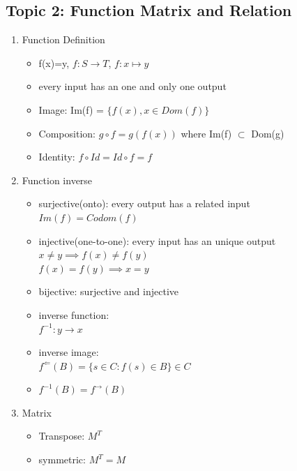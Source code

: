 \documentclass[11pt, a4paper]{article}
\begin{document}
\begin{multicols}{3}
\section*{Topic 2: Function Matrix and Relation}
    \begin{enumerate}
        \item Function Definition
            \begin{itemize}
                \item f(x)=y, $f: S \rightarrow T$, $f: x \mapsto y$
                \item every input has an one and only one output
                \item Image: Im(f) = $\{f(x), x \in Dom(f)\}$
                \item Composition: $g \circ f = g(f(x))$ where Im(f) $\subset$ Dom(g)
                \item Identity: $f \circ Id = Id \circ f = f$
            \end{itemize}
        \item Function inverse
            \begin{itemize}
                \item surjective(onto): every output has a related input\\
                    $Im(f) = Codom(f)$
                \item injective(one-to-one): every input has an unique output\\
                    $x \ne y \implies f(x) \ne f(y)$\\
                    $f(x) = f(y) \implies x = y$
                \item bijective: surjective and injective
                \item inverse function: \\
                    $f^{-1}: y \rightarrow x$
                \item inverse image:\\
                    $f^{\Leftarrow}(B) =\{s \in C: f(s) \in B\} \in C$
                \item $f^{-1}(B) = f^{\rightarrow}(B)$
            \end{itemize}
        \item Matrix
            \begin{itemize}
                \item Transpose: $M^{T}$\\
                \item symmetric: $M^T = M$

\end{itemize}
\end{enumerate}
\end{multicols}
\end{document}
